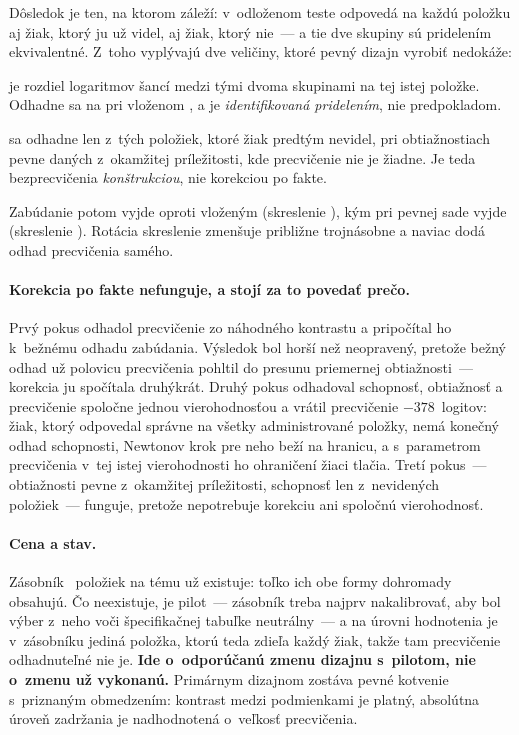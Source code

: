 Dôsledok je ten, na ktorom záleží: v~odloženom teste odpovedá na každú položku aj
žiak, ktorý ju už videl, aj žiak, ktorý nie~--- a tie dve skupiny sú pridelením
ekvivalentné. Z~toho vyplývajú dve veličiny, ktoré pevný dizajn vyrobiť nedokáže:

\begin{description}[leftmargin=0.6cm, nosep]
    \item[\textbf{Veľkosť precvičenia}] je rozdiel logaritmov šancí medzi tými
          dvoma skupinami na tej istej položke. Odhadne sa na \asmRotPractice{}
          pri vloženom \asmRotPracticePlanted{}, a je \emph{identifikovaná
          pridelením}, nie predpokladom.
    \item[\textbf{Odložená schopnosť bez precvičenia}] sa odhadne len z~tých
          položiek, ktoré žiak predtým nevidel, pri obtiažnostiach pevne daných
          z~okamžitej príležitosti, kde precvičenie nie je žiadne. Je teda
          bezprecvičenia \emph{konštrukciou}, nie korekciou po fakte.
\end{description}

Zabúdanie potom vyjde \asmRotForgetting{} oproti vloženým \asmEqPlanted{}
(skreslenie \asmRotBias), kým pri pevnej sade vyjde \asmFixForgetting{}
(skreslenie \asmFixBias). Rotácia skreslenie zmenšuje približne trojnásobne a
naviac dodá odhad precvičenia samého.

\paragraph{Korekcia po fakte nefunguje, a stojí za to povedať prečo.} Prvý pokus
odhadol precvičenie zo náhodného kontrastu a pripočítal ho k~bežnému odhadu
zabúdania. Výsledok bol horší než neopravený, pretože bežný odhad už polovicu
precvičenia pohltil do presunu priemernej obtiažnosti~--- korekcia ju spočítala
druhýkrát. Druhý pokus odhadoval schopnosť, obtiažnosť a precvičenie spoločne
jednou vierohodnosťou a vrátil precvičenie $-378$~logitov: žiak, ktorý odpovedal
správne na všetky administrované položky, nemá konečný odhad schopnosti, Newtonov
krok pre neho beží na hranicu, a s~parametrom precvičenia v~tej istej
vierohodnosti ho ohraničení žiaci tlačia. Tretí pokus~--- obtiažnosti pevne
z~okamžitej príležitosti, schopnosť len z~nevidených položiek~--- funguje, pretože
nepotrebuje korekciu ani spoločnú vierohodnosť.

\paragraph{Cena a stav.} Zásobník \asmRotPool{}~položiek na tému už existuje:
toľko ich obe formy dohromady obsahujú. Čo neexistuje, je pilot~--- zásobník treba
najprv nakalibrovať, aby bol výber z~neho voči špecifikačnej tabuľke neutrálny~---
a na úrovni hodnotenia je v~zásobníku jediná položka, ktorú teda zdieľa každý
žiak, takže tam precvičenie odhadnuteľné nie je. \textbf{Ide o~odporúčanú zmenu
dizajnu s~pilotom, nie o~zmenu už vykonanú.} Primárnym dizajnom zostáva pevné
kotvenie s~priznaným obmedzením: kontrast medzi podmienkami je platný, absolútna
úroveň zadržania je nadhodnotená o~veľkosť precvičenia.

